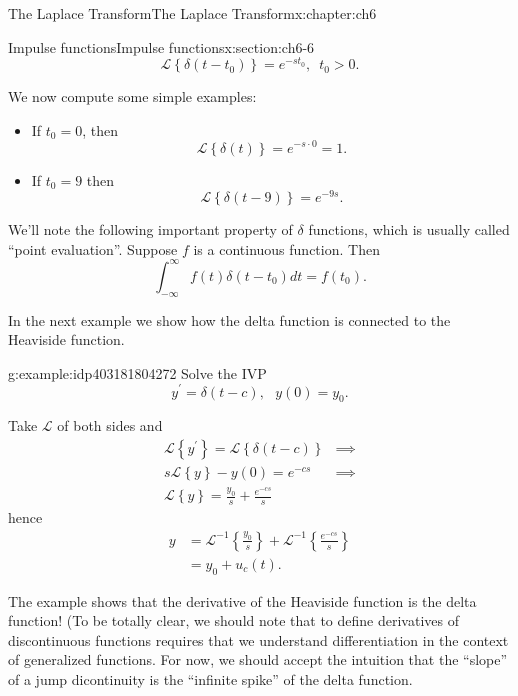 \documentclass[oneside,10pt,]{book}
\numberwithin{equation}{section}
\numberwithin{equation}{section}
\newcommand{\amp}{&}
\begin{document}
\begin{chapterptx}{The Laplace Transform}{}{The Laplace Transform}{}{}{x:chapter:ch6}
\begin{sectionptx}{Impulse functions}{}{Impulse functions}{}{}{x:section:ch6-6}
\begin{equation*}
\mathcal{L}\left\{ \delta\left(t-t_{0}\right)\right\} =e^{-st_{0}},\,\,\,t_{0}>0.
\end{equation*}
%
\par
We now compute some simple examples:%
%
\begin{itemize}[label=\textbullet]
\item{}If \(t_{0}=0\), then%
\begin{equation*}
\mathcal{L}\left\{ \delta\left(t\right)\right\} =e^{-s\cdot0}=1.
\end{equation*}
%
\item{}If \(t_{0}=9\) then%
\begin{equation*}
\mathcal{L}\left\{ \delta\left(t-9\right)\right\} =e^{-9s}.
\end{equation*}
%
\end{itemize}
We'll note the following important property of \(\delta\) functions, which is usually called ``point evaluation''. Suppose \(f\) is a continuous function. Then%
\begin{equation*}
\int_{-\infty}^{\infty}f(t)\delta(t-t_{0})dt=f\left(t_{0}\right).
\end{equation*}
%
\par
In the next example we show how the delta function is connected to the Heaviside function.%
\begin{example}{}{g:example:idp403181804272}%
Solve the IVP%
\begin{equation*}
y^{\prime}=\delta(t-c),\,\,\,\,y(0)=y_{0}.
\end{equation*}
%
\par
Take \(\mathcal{L}\) of both sides and%
\begin{align*}
\mathcal{L}\left\{ y^{\prime}\right\} =\mathcal{L}\left\{ \delta\left(t-c\right)\right\}  \amp \implies\\
s\mathcal{L}\left\{ y\right\} -y(0)=e^{-cs} \amp \implies\\
\mathcal{L}\left\{ y\right\} =\frac{y_{0}}{s}+\frac{e^{-cs}}{s}
\end{align*}
hence%
\begin{align*}
y \amp =\mathcal{L}^{-1}\left\{ \frac{y_{0}}{s}\right\} +\mathcal{L}^{-1}\left\{ \frac{e^{-cs}}{s}\right\} \\
\amp =y_{0}+u_{c}(t).
\end{align*}
%
\end{example}
The example shows that the derivative of the Heaviside function is the delta function! (To be totally clear, we should note that to define derivatives of discontinuous functions requires that we understand differentiation in the context of generalized functions. For now, we should accept the intuition that the ``slope'' of a jump dicontinuity is the ``infinite spike'' of the delta function.%

\end{sectionptx}
\end{chapterptx}
\end{document}
